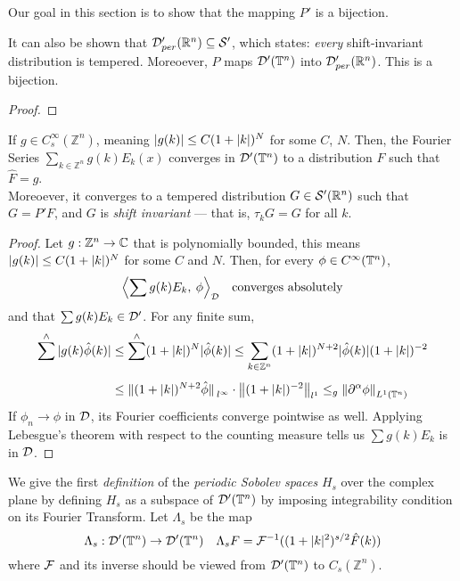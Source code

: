 \documentclass[../main-v2-manifolds.tex]{subfiles}
\begin{document}
Our goal in this section is to show that the mapping $P'$ is a bijection. 
\begin{lemma}
It can also be shown that $\mathcal{D}'_{per}({\mathbb{R}^n})\subseteq\mathcal{S}'$, which states: \emph{every} shift-invariant distribution is tempered. Moreoever, $P$ maps $\mathcal{D}'({\mathbb{T}^n})$ into $\mathcal{D}'_{per}({\mathbb{R}^n})$. This is a bijection.    
\end{lemma}
\begin{proof}
    
\end{proof}
\begin{lemma}
    If $g\in C_s^\infty(\mathbb{Z}^n)$, meaning $\vert {g(k)} \vert\leq C(1+\vert {k} \vert)^N$ for some $C$, $N$. Then, the Fourier Series $\sum_{k\in\mathbb{Z}^n}g(k)E_{k}(x)$ converges in $\mathcal{D}'({\mathbb{T}^n})$ to a distribution $F$ such that $\hat{F} = g$.\\

    Moreoever, it converges to a tempered distribution $G\in \mathcal{S}'({\mathbb{R}^n})$ such that $G = P'F$, and $G$ is \emph{shift invariant} --- that is, $\tau_k G = G$ for all $k$.
\end{lemma}
\begin{proof}
    
    Let $g: \mathbb{Z}^n\to{\mathbb{C}}$ that is polynomially bounded, this means $\vert {g(k)} \vert\leq C(1+\vert {k} \vert)^{N}$ for some $C$ and $N$. Then, for every $\phi\in C^\infty({\mathbb{T}^n})$, 
    \[
        \Big\langle {\sum g(k)E_{k}},\: {\phi} \Big\rangle_{\mathcal{D}} \quad\text{converges absolutely}
    \]
    and that $\sum g(k) E_k \in \mathcal{D}'$. For any finite sum,
    \begin{align*}
        \sum^\wedge\vert {g(k)\hat{\phi}(k)} \vert&\leq \sum^\wedge (1+\vert {k} \vert)^N \vert {\hat{\phi}(k)} \vert\leq \sum_{k\in\mathbb{Z}^n} (1+\vert {k} \vert)^{N+2}\vert {\hat{\phi}(k)} \vert(1+\vert {k} \vert)^{-2} \\[1ex]
        &\leq \norm*{(1+\vert {k} \vert)^{N+2}\hat{\phi}}_{l^\infty}\cdot\norm{(1+\vert {k} \vert)^{-2}}_{l^1}\leq_{g} \norm{\partial^{\alpha}\phi}_{L^1({\mathbb{T}^n})}
    \end{align*}
    If $\phi_n\to \phi$ in $\mathcal{D}$, its Fourier coefficients converge pointwise as well. Applying Lebesgue's theorem with respect to the counting measure tells us $\sum g(k) E_k$ is in $\mathcal{D}$.
\end{proof}




We give the first \emph{definition} of the \emph{periodic Sobolev spaces} $H_s$ over the complex plane by defining $H_s$ as a subspace of $\mathcal{D}'({\mathbb{T}^n})$ by imposing integrability condition on its Fourier Transform. Let $\Lambda_s$ be the map
\[
\Lambda_s: \mathcal{D}'({\mathbb{T}^n})\to \mathcal{D}'({\mathbb{T}^n})\quad \Lambda_s F = \mathcal{F}^{-1}((1+\vert {k} \vert^2)^{s/2}\hat{F}(k))
\]
where $\mathcal{F}$ and its inverse should be viewed from $\mathcal{D}'({\mathbb{T}^n})$ to $C_s(\mathbb{Z}^n)$.
\end{document}
